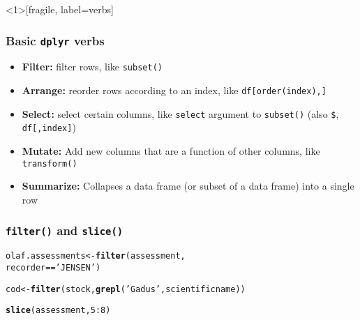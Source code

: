\documentclass{beamer}\usepackage[]{graphicx}\usepackage[]{color}
\makeatletter
\newcommand{\hlnum}[1]{\textcolor[rgb]{0.686,0.059,0.569}{#1}}%
\newcommand{\hlstr}[1]{\textcolor[rgb]{0.192,0.494,0.8}{#1}}%
\newcommand{\hlopt}[1]{\textcolor[rgb]{0,0,0}{#1}}%
\newcommand{\hlstd}[1]{\textcolor[rgb]{0.345,0.345,0.345}{#1}}%
\newcommand{\hlkwb}[1]{\textcolor[rgb]{0.69,0.353,0.396}{#1}}%
\newcommand{\hlkwd}[1]{\textcolor[rgb]{0.737,0.353,0.396}{\textbf{#1}}}%
\newenvironment{kframe}{%
 \def\at@end@of@kframe{}%
 \ifinner\ifhmode%
  \def\at@end@of@kframe{\end{minipage}}%
  \begin{minipage}{\columnwidth}%
 \fi\fi%
 \def\FrameCommand##1{\hskip\@totalleftmargin \hskip-\fboxsep
 \colorbox{shadecolor}{##1}\hskip-\fboxsep
     \hskip-\linewidth \hskip-\@totalleftmargin \hskip\columnwidth}%
 \MakeFramed {\advance\hsize-\width
   \@totalleftmargin\z@ \linewidth\hsize
   \@setminipage}}%
 {\par\unskip\endMakeFramed%
 \at@end@of@kframe}
\newenvironment{knitrout}{}{} %
\makeatother
\begin{document}
\begin{frame}<1>[fragile, label=verbs]
  \frametitle{Basic \texttt{dplyr} verbs}
  \begin{itemize}[<+->]
    \item \textbf{Filter:} filter rows, like \verb;subset();
    \item \textbf{Arrange:} reorder rows according to an index, like \verb;df[order(index),];
    \item \textbf{Select:} select certain columns, like \verb;select; argument to \verb;subset(); (also \verb;$;, \verb;df[,index];)
    \item \textbf{Mutate:} Add new columns that are a function of other columns, like \verb;transform();
    \item \textbf{Summarize:} Collapses a data frame (or subset of a data frame) into a single row
  \end{itemize}
\end{frame}

\begin{frame}[fragile]
  \frametitle{\texttt{filter()} and \texttt{slice()}}
\begin{knitrout}
\color{fgcolor}\begin{kframe}
\begin{alltt}
\hlstd{olaf.assessments} \hlkwb{<-} \hlkwd{filter}\hlstd{(assessment,}
                             \hlstd{recorder} \hlopt{==} \hlstr{'JENSEN'}\hlstd{)}
\end{alltt}
\end{kframe}
\end{knitrout}
  \pause \vspace{-20pt}
\begin{knitrout}
\color{fgcolor}\begin{kframe}
\begin{alltt}
\hlstd{cod} \hlkwb{<-} \hlkwd{filter}\hlstd{(stock,} \hlkwd{grepl}\hlstd{(}\hlstr{'Gadus'}\hlstd{, scientificname))}
\end{alltt}
\end{kframe}
\end{knitrout}
  \pause \vspace{-20pt}
\begin{knitrout}
\color{fgcolor}\begin{kframe}
\begin{alltt}
\hlkwd{slice}\hlstd{(assessment,} \hlnum{5}\hlopt{:}\hlnum{8}\hlstd{)}
\end{alltt}
\end{kframe}
\end{knitrout}
\end{frame}
\end{document}
